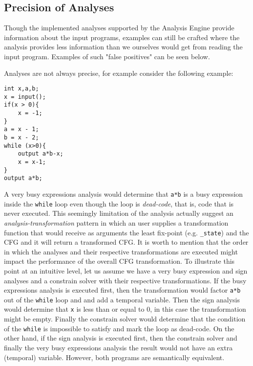 \subsection{Precision of Analyses}

Though the implemented analyses supported by the Analysis Engine provide information about the input programs, examples can still be crafted where the analysis provides less information than we ourselves would get from reading the input program. Examples of such "false positives" can be seen below. 

\newpar Analyses are not always precise, for example consider the following example:

\begin{verbatim}
int x,a,b;
x = input();
if(x > 0){
	x = -1;
}
a = x - 1;
b = x - 2;
while (x>0){
	output a*b-x;
	x = x-1;
}
output a*b;
\end{verbatim}

\newpar A very busy expressions analysis would determine that \texttt{a*b} is a busy expression inside the \texttt{while} loop even though the loop is \emph{dead-code}, that is, code that is never executed. This seemingly limitation of the analysis actually suggest an \emph{analysis-transformation} pattern in which an user supplies a transformation function that would receive as arguments the least fix-point (e.g. \texttt{\_state}) and the CFG and it will return a transformed CFG. It is worth to mention that the order in which the analyses and their respective transformations are executed might impact the performance of the overall CFG transformation. To illustrate this point at an intuitive level, let us assume we have a very busy expression and sign analyses and a constrain solver with their respective transformations. If the busy expressions analysis is executed first, then the transformation would factor \texttt{a*b} out of the \texttt{while} loop and and add a temporal variable. Then the sign analysis would determine that \texttt{x} is less than or equal to $0$, in this case the transformation might be empty. Finally the constrain solver would determine that the condition of the \texttt{while} is impossible to satisfy and mark the loop as dead-code. On the other hand, if the sign analysis is executed first, then the constrain solver and finally the very busy expressions analysis the result would not have an extra (temporal) variable. However, both programs are semantically equivalent. 